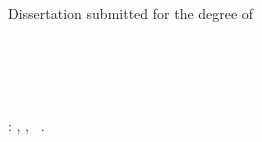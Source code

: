 \begin{titlepage}
  \begin{center}
    \large
    \hfill\vfill
    \begingroup
      \color{CTtitle}\spacedallcaps{\myTitle} \\ \bigskip
      \spacedlowsmallcaps{\mySubtitle}
    \endgroup
    \vfill
    \spacedlowsmallcaps{\myName}
    \vfill
    Dissertation submitted for the degree of \\
    \myDegree \\[1ex]
    \myFaculty \\
    \myUni \\[2ex]
    \myProf \\[2ex]
    \myTime
    \vfill\vfill
  \end{center}
\end{titlepage}

\thispagestyle{empty}
\hfill\vfill
\noindent\myName: \textit{\myTitle}, \myDegree, \textcopyright\ \myTime.
